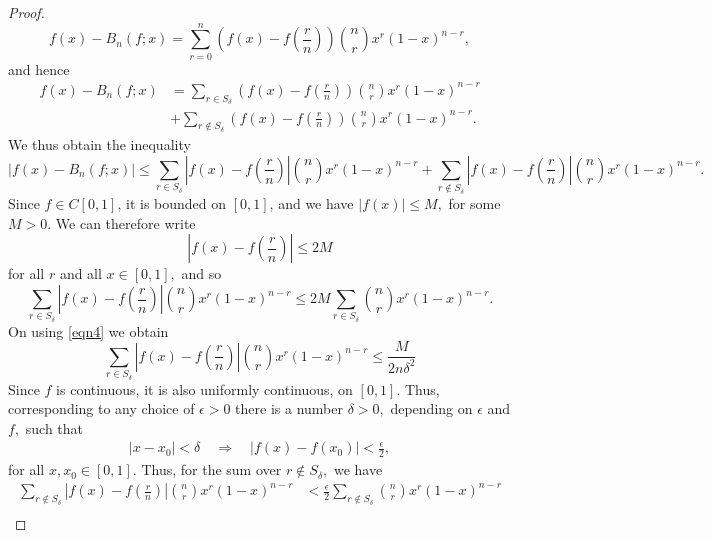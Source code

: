 \documentclass[12pt]{article}
\begin{document}
\begin{proof}
   \begin{equation*}
       f(x) - B_n(f;x) = \sum_{r=0}^n\left(f(x)-f\left(\frac{r}{n}\right)\right)\binom{n}{r}x^r(1-x)^{n-r},
   \end{equation*}
   and hence
   \begin{align*}
       f(x) - B_n(f;x)
       &=\sum_{r\in S_\delta}\left(f(x)-f\left(\frac{r}{n}\right)\right)\binom{n}{r}x^r(1-x)^{n-r}\\
       &+\sum_{r\notin S_\delta}\left(f(x)-f\left(\frac{r}{n}\right)\right)\binom{n}{r}x^r(1-x)^{n-r}.
   \end{align*}
   We thus obtain the inequality
   \begin{equation*}
       |f(x)-B_n(f;x)|\leq \sum_{r\in S_\delta}\left |f(x)-f\left(\frac{r}{n}\right)\right|\binom{n}{r}x^r(1-x)^{n-r}+ \sum_{r \notin S_\delta}\left |f(x)-f\left(\frac{r}{n}\right)\right|\binom{n}{r}x^r(1-x)^{n-r}.
   \end{equation*}
   Since $f \in C[0, 1]$, it is bounded on $[0, 1]$, and we have $|f(x)|\leq M,$ for some $M>0.$ We can therefore write
   \begin{equation*}
       \left | f(x) - f\left(\frac{r}{n}\right)\right| \leq 2M
   \end{equation*}
   for all $r$ and all $x \in [0, 1],$ and so 
   \begin{equation*}
       \sum_{r \in S_\delta}\left|f(x)-f\left(\frac{r}{n}\right)\right|\binom{n}{r}x^r(1-x)^{n-r}\leq 2M \sum_{r \in S_\delta}\binom{n}{r}x^r(1-x)^{n-r}.
   \end{equation*}
   On using \eqref{eqn4} we obtain
   \begin{equation}
       \label{eqn5}
       \sum_{r \in S_\delta}\left|f(x) - f\left(\frac{r}{n}\right)\right|\binom{n}{r}x^r(1-x)^{n-r} \leq \frac{M}{2n\delta^2}
   \end{equation}
   Since $f$ is continuous, it is also uniformly continuous, on $[0, 1].$ Thus, corresponding to any choice of $\epsilon > 0$ there is a number $\delta>0,$ depending on $\epsilon$ and $f,$ such that
   \begin{gather*}
       |x-x_0|<\delta \quad \Rightarrow \quad |f(x)-f(x_0)|<\frac{\epsilon}{2},
   \end{gather*}
   for all ${x, x_0} \in [0, 1].$ Thus, for the sum over $r \notin S_\delta,$ we have
   \begin{align*}
       \sum_{r\notin S_\delta}\left|f(x)-f\left(\frac{r}{n}\right)\right|\binom{n}{r}x^r(1-x)^{n-r}
        &<\frac{\epsilon}{2} \sum_{r \notin S_\delta}\binom{n}{r}x^r(1-x)^{n-r}\\

\end{align*}
\end{proof}
\end{document}
